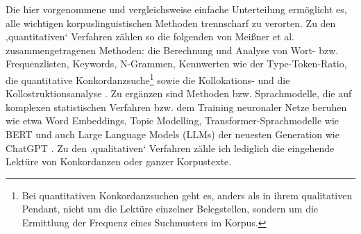 Die hier vorgenommene und vergleichsweise einfache Unterteilung ermöglicht es, alle wichtigen korpuslinguistischen Methoden trennscharf zu verorten. Zu den ‚quantitativen` Verfahren zählen so die folgenden von Meißner et al. \autocite*{meissnerKorpusanalyse2016} zusammengetragenen Methoden: die Berechnung und Analyse von Wort- bzw. Frequenzlisten, Keywords, N-Grammen, Kennwerten wie der Type-Token-Ratio, die quantitative Konkordanzsuche\footnote{Bei quantitativen Konkordanzsuchen geht es, anders als in ihrem qualitativen Pendant, nicht um die Lektüre einzelner Belegstellen, sondern um die Ermittlung der Frequenz eines Suchmusters im Korpus.} sowie die Kollokations- und die Kollostruktionsanalyse \autocite{stefanowitschCollostructionsInvestigatingInteraction2003}. Zu ergänzen sind Methoden bzw. Sprachmodelle, die auf komplexen statistischen Verfahren bzw. dem Training neuronaler Netze beruhen wie etwa Word Embeddings, Topic Modelling, Transformer-Sprachmodelle wie BERT \autocite{devlinBERTPretrainingDeep2019} und auch Large Language Models (LLMs) der neuesten Generation wie ChatGPT \autocite{openaiGPT4TechnicalReport2023}. Zu den ‚qualitativen` Verfahren zähle ich lediglich die eingehende Lektüre von Konkordanzen oder ganzer Korpustexte.

